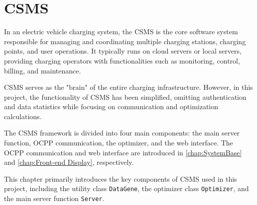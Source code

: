\documentclass[
	english,
	ruledheaders=section,%
	class=report,%
	thesis={type=Report},%
	accentcolor=9c,%
	custommargins=true,%
	marginpar=false,%
	parskip=half-,%
	fontsize=11pt,%
	logofile={img/tuda_logo.pdf}, %
]{tudapub}
\begin{document}
\chapter{CSMS}
\label{chap:CSMS}







In an electric vehicle charging system, the \ac{CSMS} is the core software system responsible for managing and coordinating multiple charging stations, charging points, and user operations. It typically runs on cloud servers or local servers, providing charging operators with functionalities such as monitoring, control, billing, and maintenance\cite{CSMS}. 

\ac{CSMS} serves as the "brain" of the entire charging infrastructure. However, in this project, the functionality of \ac{CSMS} has been simplified, omitting authentication and data statistics while focusing on communication and optimization calculations.

The \ac{CSMS} framework is divided into four main components: the main server function, \ac{OCPP} communication, the optimizer, and the web interface. The \ac{OCPP} communication and web interface are introduced in \autoref{chap:SystemBase} and \autoref{chap:Front-end Display}, respectively.

This chapter primarily introduces the key components of \ac{CSMS} used in this project, including the utility class \texttt{DataGene}, the optimizer class \texttt{Optimizer}, and the main server function \texttt{Server}.

\end{document}
